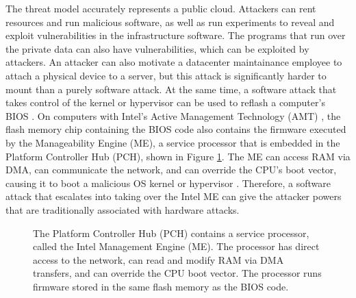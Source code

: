 The threat model accurately represents a public cloud. Attackers can rent
resources and run malicious software, as well as run experiments to reveal and
exploit vulnerabilities in the infrastructure software. The programs that run
over the private data can also have vulnerabilities, which can be exploited by
attackers. An attacker can also motivate a datacenter maintainance employee to
attach a physical device to a server, but this attack is significantly harder
to mount than a purely software attack. At the same time, a software attack
that takes control of the kernel or hypervisor can be used to reflash a
computer's BIOS \cite{wojtczuk2010bios}. On computers with Intel's Active
Management Technology (AMT) \cite{intel2013amt}, the flash memory chip
containing the BIOS code also contains the firmware executed by the
Manageability Engine (ME), a service processor that is embedded in the
Platform Controller Hub (PCH), shown in Figure \ref{fig:pch}. The ME can access
RAM via DMA, can communicate the network, and can override the CPU's boot
vector, causing it to boot a malicious OS kernel or hypervisor
\cite{tereshkin2009amt}. Therefore, a software attack that escalates into
taking over the Intel ME can give the attacker powers that are traditionally
associated with hardware attacks.

\begin{figure}[hbtp]
  \caption{
    The Platform Controller Hub (PCH) contains a service processor, called the
    Intel Management Engine (ME). The processor has direct access to the
    network, can read and modify RAM via DMA transfers, and can override the
    CPU boot vector. The processor runs firmware stored in the same flash
    memory as the BIOS code.
  }
  \label{fig:pch}
\end{figure}

